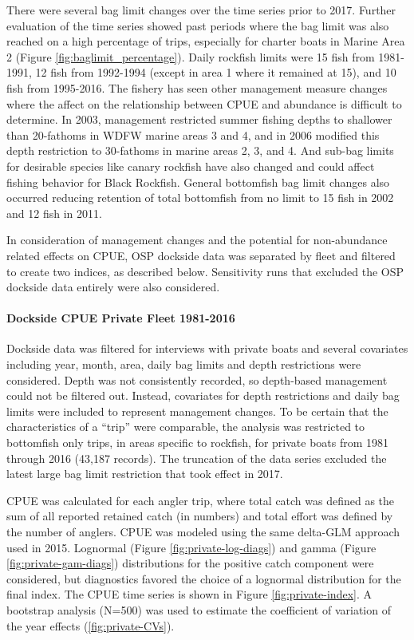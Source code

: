 \documentclass[11pt,
  english,
  letterpaper,
]{article}
\begin{document}
There were several bag limit changes over the time series prior to 2017. Further evaluation of the time series showed past periods where the bag limit was also reached on a high percentage of trips, especially for charter boats in Marine Area 2 (Figure \ref{fig:baglimit_percentage}). Daily rockfish limits were 15 fish from 1981-1991, 12 fish from 1992-1994 (except in area 1 where it remained at 15), and 10 fish from 1995-2016. The fishery has seen other management measure changes where the affect on the relationship between CPUE and abundance is difficult to determine. In 2003, management restricted summer fishing depths to shallower than 20-fathoms in WDFW marine areas 3 and 4, and in 2006 modified this depth restriction to 30-fathoms in marine areas 2, 3, and 4. And sub-bag limits for desirable species like canary rockfish have also changed and could affect fishing behavior for Black Rockfish. General bottomfish bag limit changes also occurred reducing retention of total bottomfish from no limit to 15 fish in 2002 and 12 fish in 2011.

In consideration of management changes and the potential for non-abundance related effects on CPUE, OSP dockside data was separated by fleet and filtered to create two indices, as described below. Sensitivity runs that excluded the OSP dockside data entirely were also considered.

\hypertarget{dockside-cpue-private-fleet-1981-2016}{%
\paragraph{Dockside CPUE Private Fleet 1981-2016}\label{dockside-cpue-private-fleet-1981-2016}}

Dockside data was filtered for interviews with private boats and several covariates including year, month, area, daily bag limits and depth restrictions were considered. Depth was not consistently recorded, so depth-based management could not be filtered out. Instead, covariates for depth restrictions and daily bag limits were included to represent management changes. To be certain that the characteristics of a ``trip'' were comparable, the analysis was restricted to bottomfish only trips, in areas specific to rockfish, for private boats from 1981 through 2016 (43,187 records). The truncation of the data series excluded the latest large bag limit restriction that took effect in 2017.

CPUE was calculated for each angler trip, where total catch was defined as the sum of all reported retained catch (in numbers) and total effort was defined by the number of anglers. CPUE was modeled using the same delta-GLM approach used in 2015. Lognormal (Figure \ref{fig:private-log-diags}) and gamma (Figure \ref{fig:private-gam-diags}) distributions for the positive catch component were considered, but diagnostics favored the choice of a lognormal distribution for the final index. The CPUE time series is shown in Figure \ref{fig:private-index}. A bootstrap analysis (N=500) was used to estimate the coefficient of variation of the year effects (\ref{fig:private-CVs}).
\end{document}
